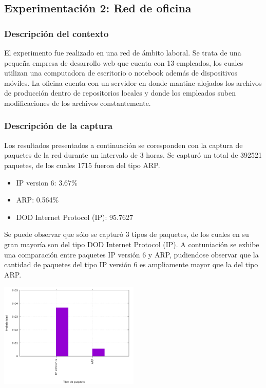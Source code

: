 
\subsection{Experimentaci\'on 2: Red de oficina}

\subsubsection{Descripci\'on del contexto}
El experimento fue realizado en una red de ámbito laboral. Se trata de una pequeña empresa de desarrollo web que cuenta con 13 empleados, los cuales utilizan una computadora de escritorio o notebook además de dispositivos móviles. La oficina cuenta con un servidor en donde mantine alojados los archivos de producción dentro de repositorios locales y donde los empleados suben modificaciones de los archivos constantemente.

\subsubsection{Descripci\'on de la captura}
Los resultados presentados a continuación se coresponden con la captura de paquetes de la red durante un intervalo de 3 horas.
Se capturó un total de 392521 paquetes, de los cuales 1715 fueron del tipo ARP.
\begin{itemize}
\item IP version 6: 3.67\%
\item ARP: 0.564\%
\item DOD Internet Protocol (IP): 95.7627%
\end{itemize}
Se puede observar que sólo se capturó 3 tipos de paquetes, de los cuales en su gran mayoría son del tipo DOD Internet Protocol (IP).
A contuniación se exhibe una comparación entre paquetes IP versión 6 y ARP, pudiendose observar que la cantidad de paquetes del tipo IP versión 6 es ampliamente mayor que la del tipo ARP.
\begin{center}
\includegraphics[width=0.5\textwidth]{exp2-graficos/grafico1exp2.png}
\end{center}

